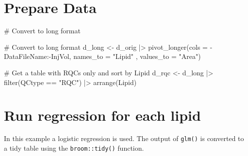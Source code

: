 \documentclass[
  letterpaper,
  DIV=11,
  numbers=noendperiod]{scrreprt}
\newenvironment{Shaded}{\begin{snugshade}}{\end{snugshade}}
\newcommand{\AttributeTok}[1]{\textcolor[rgb]{0.40,0.45,0.13}{#1}}
\newcommand{\CommentTok}[1]{\textcolor[rgb]{0.37,0.37,0.37}{#1}}
\newcommand{\FunctionTok}[1]{\textcolor[rgb]{0.28,0.35,0.67}{#1}}
\newcommand{\NormalTok}[1]{\textcolor[rgb]{0.00,0.23,0.31}{#1}}
\newcommand{\OtherTok}[1]{\textcolor[rgb]{0.00,0.23,0.31}{#1}}
\newcommand{\SpecialCharTok}[1]{\textcolor[rgb]{0.37,0.37,0.37}{#1}}
\newcommand{\StringTok}[1]{\textcolor[rgb]{0.13,0.47,0.30}{#1}}
\begin{document}
\hypertarget{prepare-data-1}{%
\section{Prepare Data}\label{prepare-data-1}}

\begin{Shaded}
\begin{Highlighting}[]
\CommentTok{\# Convert to long format}

\CommentTok{\# Convert to long format}
\NormalTok{d\_long }\OtherTok{\textless{}{-}}\NormalTok{ d\_orig }\SpecialCharTok{|\textgreater{}} 
  \FunctionTok{pivot\_longer}\NormalTok{(}\AttributeTok{cols =} \SpecialCharTok{{-}}\NormalTok{DataFileName}\SpecialCharTok{:{-}}\NormalTok{InjVol, }
               \AttributeTok{names\_to =} \StringTok{"Lipid"}\NormalTok{ , }
               \AttributeTok{values\_to =} \StringTok{"Area"}\NormalTok{)}

\CommentTok{\# Get a table with RQCs only and sort by Lipid}
\NormalTok{d\_rqc }\OtherTok{\textless{}{-}}\NormalTok{ d\_long }\SpecialCharTok{|\textgreater{}} 
  \FunctionTok{filter}\NormalTok{(QCtype }\SpecialCharTok{==} \StringTok{"RQC"}\NormalTok{) }\SpecialCharTok{|\textgreater{}} 
  \FunctionTok{arrange}\NormalTok{(Lipid)}
\end{Highlighting}
\end{Shaded}

\hypertarget{run-regression-for-each-lipid}{%
\section{Run regression for each
lipid}\label{run-regression-for-each-lipid}}

In this example a logistic regression is used. The output of
\texttt{glm()} is converted to a tidy table using the
\texttt{broom::tidy()} function.
\end{document}
